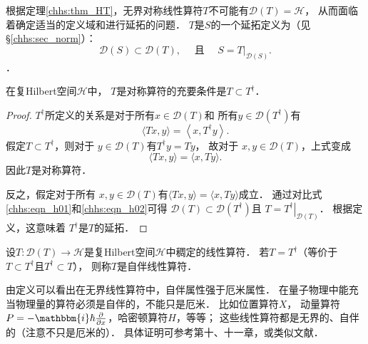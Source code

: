 根据定理\ref{chhs:thm_HT}，无界对称线性算符$T$不可能有$\mathscr{D}(T)=\mathcal{H}$，
从而面临着确定适当的定义域和进行延拓的问题．
$T$是$S$的一个延拓定义为（见\S\ref{chhs:sec_norm}）：
\begin{equation}
	\mathscr{D}(S) \subset \mathscr{D}(T), 
	\quad \text { 且 } \quad S=\left.T\right|_{\mathscr{D}(S)} .
\end{equation}
．

\begin{proposition}
	在复Hilbert空间$\mathcal{H}$中，
	$T$是对称算符的充要条件是$T \subset T^{\dagger}$．
\end{proposition}

\begin{proof}
$T^{\dagger}$所定义的关系是对于所有$x \in \mathscr{D}(T)$和
所有$y \in \mathscr{D}\left(T^{\dagger}\right)$有
\begin{equation}\label{chhs:eqn_h01}
	\langle T x, y\rangle=\left\langle x, T^{\dagger} y\right\rangle . 
\end{equation}
假定$T \subset T^{\dagger}$，则对于 $y \in \mathscr{D}(T)$有$T^{\dagger} y=T y$，
故对于 $x, y \in \mathscr{D}(T)$，上式变成
\begin{equation}\label{chhs:eqn_h02}
	\langle T x, y\rangle=\langle x, T y\rangle . 
\end{equation}
因此$T$是对称算符．

反之，假定对于所有 $x, y \in \mathscr{D}(T)$有$\langle T x, y\rangle=\langle x, T y\rangle$成立．
通过对比式\eqref{chhs:eqn_h01}和\eqref{chhs:eqn_h02}可得
$\mathscr{D}(T) \subset \mathscr{D}\left(T^{\dagger}\right)$且
$T=\left.T^{\dagger}\right|_{\mathscr{D}(T)}$．
根据定义，这意味着 $T^{\dagger}$是$T$的延拓．
\end{proof}

 

\begin{definition}
	设$T: \mathscr{D}(T) \rightarrow \mathcal{H}$是复Hilbert空间$\mathcal{H}$中稠定的线性算符．
	若$T=T^{\dagger}$（等价于$T \subset T^{\dagger}$且$T^{\dagger} \subset T$），
	则称$T$是{\heiti 自伴线性算符}．
\end{definition}



由定义可以看出在无界线性算符中，自伴属性强于厄米属性．
在量子物理中能充当{\kaishu 物理量}的算符必须是自伴的，不能只是厄米．
比如位置算符$X$，
动量算符$P=-\mathbbm{i}\hbar \frac{\partial}{\partial x}$，哈密顿算符$H$，等等；
这些线性算符都是无界的、自伴的（注意不只是厄米的）．
具体证明可参考\parencite{Kreyszig-1991}第十、十一章，或类似文献．


